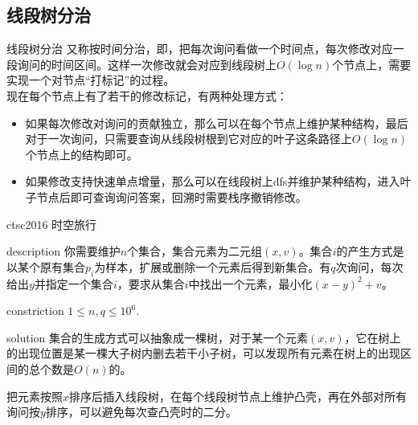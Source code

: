 \documentclass{beamer}
\begin{document}
	\subsection{线段树分治}
	\begin{frame}{线段树分治}
		又称按时间分治，即，把每次询问看做一个时间点，每次修改对应一段询问的时间区间。这样一次修改就会对应到线段树上$O(\log n)$个节点上，需要实现一个对节点“打标记”的过程。\\
		
		现在每个节点上有了若干的修改标记，有两种处理方式：
		
		\begin{itemize}
			\item 如果每次修改对询问的贡献独立，那么可以在每个节点上维护某种结构，最后对于一次询问，只需要查询从线段树根到它对应的叶子这条路径上$O(\log n)$个节点上的结构即可。
			\item 如果修改支持快速单点增量，那么可以在线段树上dfs并维护某种结构，进入叶子节点后即可查询询问答案，回溯时需要栈序撤销修改。
		\end{itemize}
	\end{frame}
	\begin{frame}{ctsc2016 时空旅行}
		\begin{block}{description}
			你需要维护$n$个集合，集合元素为二元组$(x,v)$。集合$i$的产生方式是以某个原有集合$p_i$为样本，扩展或删除一个元素后得到新集合。有$q$次询问，每次给出$y$并指定一个集合$i$，要求从集合$i$中找出一个元素，最小化$(x-y)^2+v$。
		\end{block}
		\begin{block}{constriction}
			$1 \le n, q \le 10^6.$
		\end{block}
		\pause
		\begin{block}{solution}
			集合的生成方式可以抽象成一棵树，对于某一个元素$(x,v)$，它在树上的出现位置是某一棵大子树内删去若干小子树，可以发现所有元素在树上的出现区间的总个数是$O(n)$的。
			
			把元素按照$x$排序后插入线段树，在每个线段树节点上维护凸壳，再在外部对所有询问按$y$排序，可以避免每次查凸壳时的二分。
		\end{block}
	\end{frame}
\end{document}
